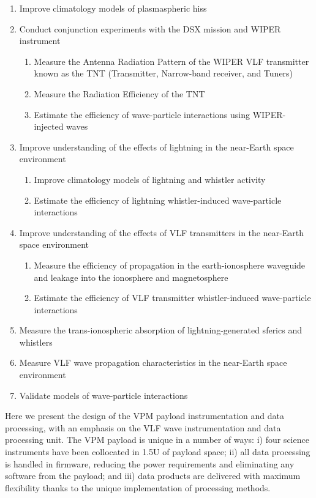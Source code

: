 \begin{enumerate}
\item Improve climatology models of plasmaspheric hiss
\item Conduct conjunction experiments with the DSX mission and WIPER instrument
	\begin{enumerate}
	\item Measure the Antenna Radiation Pattern of the WIPER VLF transmitter known as the TNT (Transmitter, Narrow-band receiver, and Tuners)
	\item Measure the Radiation Efficiency of the TNT
	\item Estimate the efficiency of wave-particle interactions using WIPER-injected waves
	\end{enumerate}
\item Improve understanding of the effects of lightning in the near-Earth space environment
	\begin{enumerate}
	\item Improve climatology models of lightning and whistler activity
	\item Estimate the efficiency of lightning whistler-induced wave-particle interactions
	\end{enumerate}
\item Improve understanding of the effects of VLF transmitters in the near-Earth space environment
	\begin{enumerate}
	\item Measure the efficiency of propagation in the earth-ionosphere waveguide and leakage into the ionosphere and magnetosphere
	\item Estimate the efficiency of VLF transmitter whistler-induced wave-particle interactions
	\end{enumerate}
\item Measure the trans-ionospheric absorption of lightning-generated sferics and whistlers
\item Measure VLF wave propagation characteristics in the near-Earth space environment
\item Validate models of wave-particle interactions
\end{enumerate}


Here we present the design of the VPM payload instrumentation and data processing, with an emphasis on the VLF wave instrumentation and data processing unit. The VPM payload is unique in a number of ways: i) four science instruments have been collocated in 1.5U of payload space; ii) all data processing is handled in firmware, reducing the power requirements and eliminating any software from the payload; and iii) data products are delivered with maximum flexibility thanks to the unique implementation of processing methods.


